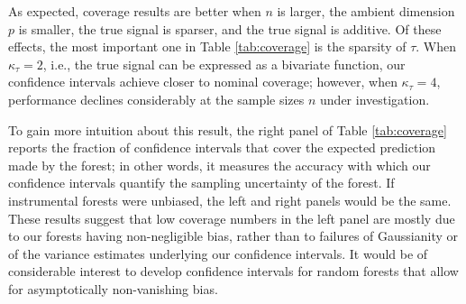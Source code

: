 \documentclass[aos]{imsart}
\theoremstyle{plain}
\theoremstyle{definition}
\theoremstyle{remark}
\begin{document}
\begin{CJK}{UTF8}{gbsn}
{\begin{appendix}
As expected, coverage results are better when $n$ is larger, the ambient dimension $p$ is smaller,
the true signal is sparser, and the true signal is additive. Of these effects, the most important one
in Table \ref{tab:coverage} is the sparsity of $\tau$. When $\kappa_\tau = 2$, i.e., the true signal
can be expressed as a bivariate function, our confidence intervals achieve closer to nominal coverage;
however, when $\kappa_\tau = 4$, performance declines considerably at the sample sizes $n$ under
investigation.

To gain more intuition about this result, the right panel of Table \ref{tab:coverage} reports the fraction
of confidence intervals that cover the expected prediction made by the forest; in other words, it measures
the accuracy with which our confidence intervals quantify the sampling uncertainty of the forest.
If instrumental forests were unbiased, the left and right panels would be the same.
These results suggest that low coverage numbers in the left panel are mostly due to our forests having non-negligible bias,
rather than to failures of Gaussianity or of the variance estimates underlying our confidence intervals.
It would be of considerable interest to develop confidence intervals for random forests that allow
for asymptotically non-vanishing bias.


\end{appendix}}


\end{CJK}
\end{document}
